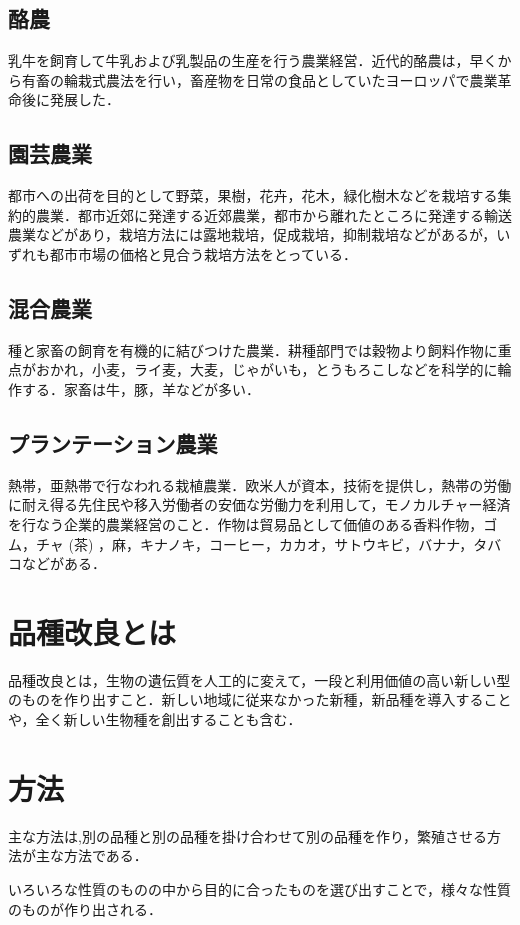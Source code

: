 \subsection{酪農}
乳牛を飼育して牛乳および乳製品の生産を行う農業経営．近代的酪農は，早くから有畜の輪栽式農法を行い，畜産物を日常の食品としていたヨーロッパで農業革命後に発展した．

\subsection{園芸農業}
都市への出荷を目的として野菜，果樹，花卉，花木，緑化樹木などを栽培する集約的農業．都市近郊に発達する近郊農業，都市から離れたところに発達する輸送農業などがあり，栽培方法には露地栽培，促成栽培，抑制栽培などがあるが，いずれも都市市場の価格と見合う栽培方法をとっている．

\subsection{混合農業}
種と家畜の飼育を有機的に結びつけた農業．耕種部門では穀物より飼料作物に重点がおかれ，小麦，ライ麦，大麦，じゃがいも，とうもろこしなどを科学的に輪作する．家畜は牛，豚，羊などが多い．
\subsection{プランテーション農業}
熱帯，亜熱帯で行なわれる栽植農業．欧米人が資本，技術を提供し，熱帯の労働に耐え得る先住民や移入労働者の安価な労働力を利用して，モノカルチャー経済を行なう企業的農業経営のこと．作物は貿易品として価値のある香料作物，ゴム，チャ (茶) ，麻，キナノキ，コーヒー，カカオ，サトウキビ，バナナ，タバコなどがある．
\section{品種改良とは}
品種改良とは，生物の遺伝質を人工的に変えて，一段と利用価値の高い新しい型のものを作り出すこと．新しい地域に従来なかった新種，新品種を導入することや，全く新しい生物種を創出することも含む．\cite{kinoko2015}
\section{方法}
主な方法は,別の品種と別の品種を掛け合わせて別の品種を作り，繁殖させる方法が主な方法である．

いろいろな性質のものの中から目的に合ったものを選び出すことで，様々な性質のものが作り出される．

